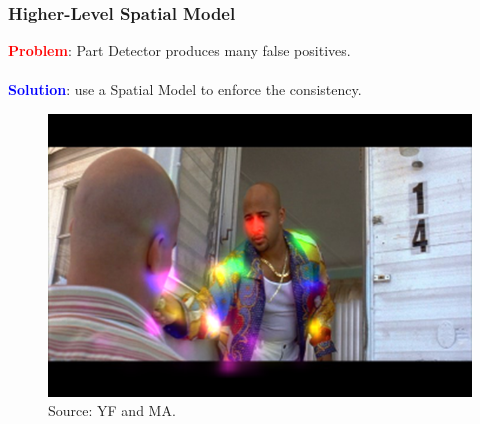\documentclass{beamer}
\newcommand\red[1]{\textcolor{red}{\textbf{#1}}}
\newcommand\blue[1]{\textcolor{blue}{\textbf{#1}}}
\begin{document}
	\begin{frame}[t]
        \frametitle{Higher-Level Spatial Model}
        \begin{center}
            \red{Problem}: Part Detector produces many false positives. \\ \ \\
			\blue{Solution}: use a Spatial Model to enforce the consistency.\\
        
         \begin{figure} %
            \includegraphics[scale=0.52]{false_positive.png} \\
            \scriptsize Source: YF and MA.
         \end{figure}
        \end{center}
    \end{frame}
\end{document}
